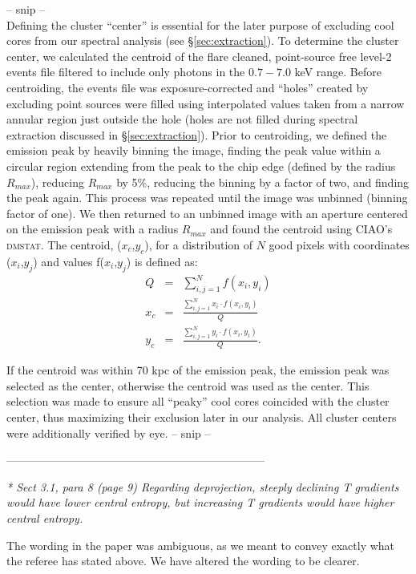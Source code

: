 \documentclass[11pt]{article}
\begin{document}
-- snip --\\
Defining the cluster ``center'' is essential for the later purpose of
excluding cool cores from our spectral analysis (see
\S\ref{sec:extraction}). To determine the cluster center, we
calculated the centroid of the flare cleaned, point-source free
level-2 events file filtered to include only photons in the $0.7-7.0$
keV range. Before centroiding, the events file was exposure-corrected
and ``holes'' created by excluding point sources were filled using
interpolated values taken from a narrow annular region just outside
the hole (holes are not filled during spectral extraction discussed in
\S\ref{sec:extraction}). Prior to centroiding, we defined the emission
peak by heavily binning the image, finding the peak value within a
circular region extending from the peak to the chip edge (defined by
the radius $R_{max}$), reducing $R_{max}$ by 5\%, reducing the binning
by a factor of two, and finding the peak again. This process was
repeated until the image was unbinned (binning factor of one). We then
returned to an unbinned image with an aperture centered on the
emission peak with a radius $R_{max}$ and found the centroid using
{\textsc{CIAO}}'s {\textsc{dmstat}}. The centroid, ($x_c$,$y_c$), for
a distribution of $N$ good pixels with coordinates ($x_i$,$y_j$) and
values f($x_i$,$y_j$) is defined as:
\begin{eqnarray}
Q &=& \sum_{i,j=1}^N f(x_i,y_i) \\
x_c &=& \frac{\sum_{i,j=1}^N x_i \cdot f(x_i,y_i)}{Q} \nonumber\\
y_c &=& \frac{\sum_{i,j=1}^N y_i \cdot f(x_i,y_i)}{Q}. \nonumber
\end{eqnarray}

If the centroid was within 70 kpc of the emission peak, the emission
peak was selected as the center, otherwise the centroid was used
as the center. This selection was made to ensure all ``peaky'' cool
cores coincided with the cluster center, thus maximizing their
exclusion later in our analysis. All cluster centers were additionally
verified by eye.
-- snip --

---------------------------------------------------------------------

{\it{* Sect 3.1, para 8 (page 9) Regarding deprojection, steeply
    declining T gradients would have lower central entropy, but
    increasing T gradients would have higher central entropy.}}

The wording in the paper was ambiguous, as we meant to convey exactly
what the referee has stated above. We have altered the wording to be
clearer.
\end{document}
